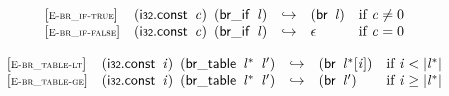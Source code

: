 \vspace{1ex}

$$
\begin{array}{@{}l@{}lcl@{}l@{}}
{[\textsc{\scriptsize E{-}br\_if{-}true}]} \quad & (\mathsf{i{\scriptstyle32}}.\mathsf{const}~\,{\mathit{c}})~\,(\mathsf{br\_if}~\,{\mathit{l}}) &\hookrightarrow& (\mathsf{br}~\,{\mathit{l}}) &\quad
  \mbox{if}~{\mathit{c}} \neq 0 \\
{[\textsc{\scriptsize E{-}br\_if{-}false}]} \quad & (\mathsf{i{\scriptstyle32}}.\mathsf{const}~\,{\mathit{c}})~\,(\mathsf{br\_if}~\,{\mathit{l}}) &\hookrightarrow& \epsilon &\quad
  \mbox{if}~{\mathit{c}} = 0 \\
\end{array}
$$

\vspace{1ex}

$$
\begin{array}{@{}l@{}lcl@{}l@{}}
{[\textsc{\scriptsize E{-}br\_table{-}lt}]} \quad & (\mathsf{i{\scriptstyle32}}.\mathsf{const}~\,{\mathit{i}})~\,(\mathsf{br\_table}~\,{{\mathit{l}}^\ast}~\,{\mathit{l}'}) &\hookrightarrow& (\mathsf{br}~\,{{\mathit{l}}^\ast}{}[{\mathit{i}}]) &\quad
  \mbox{if}~{\mathit{i}} < {|{{\mathit{l}}^\ast}|} \\
{[\textsc{\scriptsize E{-}br\_table{-}ge}]} \quad & (\mathsf{i{\scriptstyle32}}.\mathsf{const}~\,{\mathit{i}})~\,(\mathsf{br\_table}~\,{{\mathit{l}}^\ast}~\,{\mathit{l}'}) &\hookrightarrow& (\mathsf{br}~\,{\mathit{l}'}) &\quad
  \mbox{if}~{\mathit{i}} \geq {|{{\mathit{l}}^\ast}|} \\
\end{array}
$$

\vspace{1ex}

